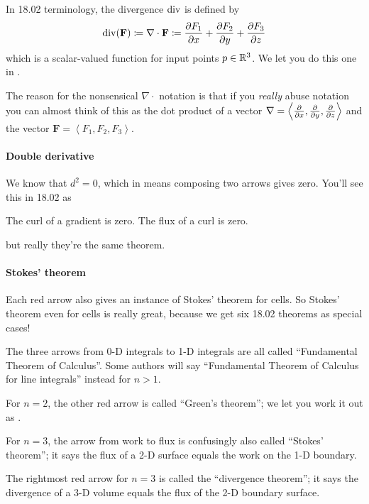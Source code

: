 \begin{itemize}
	\ii In 18.02 terminology, the divergence $\operatorname{div}$ is defined by
	\[ \operatorname{div}(\mathbf{F}) \coloneqq \nabla \cdot \mathbf{F} \coloneqq
		\pdv{F_1}{x} + \pdv{F_2}{y} + \pdv{F_3}{z} \]
	which is a scalar-valued function for input points $p \in \mathbb R^3$.
	We let you do this one in .

	The reason for the nonsensical $\nabla \cdot$ notation
	is that if you \emph{really} abuse notation you can almost think of this as
	the dot product of a vector $\nabla = \left< \pdv{}x, \pdv{}y, \pdv{}z \right>$
	and the vector $\mathbf{F} = \left< F_1, F_2, F_3 \right>$.
\end{itemize}

\paragraph{Double derivative}
We know that $d^2=0$,
which in  means composing two arrows gives zero.
You'll see this in 18.02 as
\begin{itemize}
	\ii The curl of a gradient is zero.
	\ii The flux of a curl is zero.
\end{itemize}
but really they're the same theorem.

\paragraph{Stokes' theorem}
Each red arrow also gives an instance of Stokes' theorem for cells.
So Stokes' theorem even for cells is really great,
because we get six 18.02 theorems as special cases!
\begin{itemize}
	\ii The three arrows from 0-D integrals to 1-D integrals are all called
	``Fundamental Theorem of Calculus''.
	Some authors will say ``Fundamental Theorem of Calculus for line integrals''
	instead for $n > 1$.

	\ii For $n=2$, the other red arrow is called ``Green's theorem'';
	we let you work it out as .

	\ii For $n=3$, the arrow from work to flux is confusingly also called
	``Stokes' theorem''; it says the flux of a 2-D surface equals the work on the 1-D boundary.

	\ii The rightmost red arrow for $n = 3$
	is called the ``divergence theorem'';
	it says the divergence of a 3-D volume equals the flux of the 2-D boundary surface.
\end{itemize}




